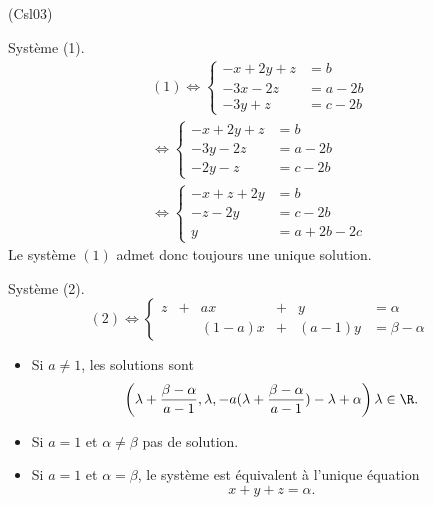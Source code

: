 \begin{tiny}(Csl03)\end{tiny}
Système (1).
\begin{multline*}
  (1)\Leftrightarrow
\left\lbrace 
\begin{aligned}
  -x+2y+z &= b \\
  -3x -2z &= a-2b \\
  -3y+z &= c-2b
\end{aligned}
\right.\\
\Leftrightarrow
\left\lbrace 
\begin{aligned}
  -x+2y+z &= b \\
  -3y -2z &= a-2b \\
  -2y-z &= c-2b
\end{aligned}
\right.\\
\Leftrightarrow
\left\lbrace 
\begin{aligned}
  -x+z+2y &= b  \\
  -z-2y &= c-2b\\
  y &=a+2b-2c
\end{aligned}
\right.
\end{multline*}
Le système $(1)$ admet donc toujours une unique solution.

Système (2).
\begin{displaymath}
  (2)\Leftrightarrow 
\left\lbrace 
\begin{alignedat}{4}
  z & + & ax    & + & y      &= \alpha \\
    &   &(1-a)x & + & (a-1)y &= \beta -\alpha
\end{alignedat}
\right.
\end{displaymath}
\begin{itemize}
  \item Si $a\neq 1$, les solutions sont
\begin{displaymath}
  \left( \lambda + \frac{\beta - \alpha}{a-1}, \lambda, -a(\lambda + \frac{\beta - \alpha}{a-1})-\lambda + \alpha \right) \lambda \in \R.
\end{displaymath}
  \item Si $a=1$ et $\alpha \neq \beta$ pas de solution.
  \item Si $a=1$ et $\alpha = \beta$, le système est équivalent à l'unique équation
\[
  x+y+z=\alpha.
\]
\end{itemize}

